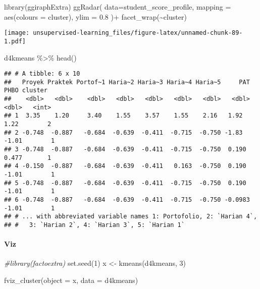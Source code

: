 \documentclass[
]{article}
\newenvironment{Shaded}{\begin{snugshade}}{\end{snugshade}}
\newcommand{\AttributeTok}[1]{\textcolor[rgb]{0.77,0.63,0.00}{#1}}
\newcommand{\CommentTok}[1]{\textcolor[rgb]{0.56,0.35,0.01}{\textit{#1}}}
\newcommand{\DecValTok}[1]{\textcolor[rgb]{0.00,0.00,0.81}{#1}}
\newcommand{\FloatTok}[1]{\textcolor[rgb]{0.00,0.00,0.81}{#1}}
\newcommand{\FunctionTok}[1]{\textcolor[rgb]{0.00,0.00,0.00}{#1}}
\newcommand{\NormalTok}[1]{#1}
\newcommand{\OtherTok}[1]{\textcolor[rgb]{0.56,0.35,0.01}{#1}}
\newcommand{\SpecialCharTok}[1]{\textcolor[rgb]{0.00,0.00,0.00}{#1}}
\begin{document}
\begin{Shaded}
\begin{Highlighting}[]
\FunctionTok{library}\NormalTok{(ggiraphExtra)}
\FunctionTok{ggRadar}\NormalTok{(}
  \AttributeTok{data=}\NormalTok{student\_score\_profile,}
  \AttributeTok{mapping =} \FunctionTok{aes}\NormalTok{(}\AttributeTok{colours =}\NormalTok{ cluster),}
  \AttributeTok{ylim =} \FloatTok{0.8}
\NormalTok{)}\SpecialCharTok{+}
  \FunctionTok{facet\_wrap}\NormalTok{(}\SpecialCharTok{\textasciitilde{}}\NormalTok{cluster)}
\end{Highlighting}
\end{Shaded}

\texttt{[image: unsupervised-learning\_files/figure-latex/unnamed-chunk-89-1.pdf]}

\begin{Shaded}
\begin{Highlighting}[]
\NormalTok{d4kmeans }\SpecialCharTok{\%\textgreater{}\%} 
  \FunctionTok{head}\NormalTok{()}
\end{Highlighting}
\end{Shaded}

\begin{verbatim}
## # A tibble: 6 x 10
##   Proyek Praktek Portof~1 Haria~2 Haria~3 Haria~4 Haria~5     PAT   PHBO cluster
##    <dbl>   <dbl>    <dbl>   <dbl>   <dbl>   <dbl>   <dbl>   <dbl>  <dbl>   <int>
## 1  3.35    1.20     3.40    1.55    3.57    1.55    2.16   1.92    1.22        2
## 2 -0.748  -0.887   -0.684  -0.639  -0.411  -0.715  -0.750 -1.83   -1.01        1
## 3 -0.748  -0.887   -0.684  -0.639  -0.411  -0.715  -0.750  0.190   0.477       1
## 4 -0.150  -0.887   -0.684  -0.639  -0.411   0.163  -0.750  0.190  -1.01        1
## 5 -0.748  -0.887   -0.684  -0.639  -0.411  -0.715  -0.750  0.190  -1.01        1
## 6 -0.748  -0.887   -0.684  -0.639  -0.411  -0.715  -0.750 -0.0983 -1.01        1
## # ... with abbreviated variable names 1: Portofolio, 2: `Harian 4`,
## #   3: `Harian 2`, 4: `Harian 3`, 5: `Harian 1`
\end{verbatim}

\hypertarget{viz}{%
\paragraph{Viz}\label{viz}}

\begin{Shaded}
\begin{Highlighting}[]
\CommentTok{\#library(factoextra)}
\FunctionTok{set.seed}\NormalTok{(}\DecValTok{1}\NormalTok{)}
\NormalTok{x }\OtherTok{\textless{}{-}} \FunctionTok{kmeans}\NormalTok{(d4kmeans, }\DecValTok{3}\NormalTok{)}

\FunctionTok{fviz\_cluster}\NormalTok{(}\AttributeTok{object =}\NormalTok{ x, }
             \AttributeTok{data =}\NormalTok{ d4kmeans)}
\end{Highlighting}
\end{Shaded}
\end{document}
